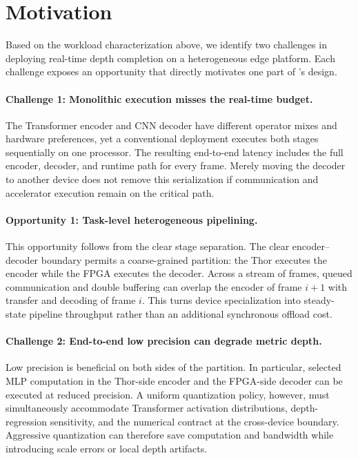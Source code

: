 \section{Motivation}
\label{sec:motivation}

Based on the workload characterization above, we identify two challenges in
deploying real-time depth completion on a heterogeneous edge platform.  Each
challenge exposes an opportunity that directly motivates one part of
\system's design.

\paragraph{Challenge 1: Monolithic execution misses the real-time budget.}

The Transformer encoder and CNN decoder have different operator mixes and
hardware preferences, yet a conventional deployment executes both stages
sequentially on one processor.  The resulting end-to-end latency includes the
full encoder, decoder, and runtime path for every frame.  Merely moving the
decoder to another device does not remove this serialization if communication
and accelerator execution remain on the critical path.

\paragraph{Opportunity 1: Task-level heterogeneous pipelining.}
This opportunity follows from the clear stage separation.
The clear encoder--decoder boundary permits a coarse-grained partition: the
Thor executes the encoder while the FPGA executes the decoder.  Across a
stream of frames, queued communication and double buffering can overlap the
encoder of frame $i+1$ with transfer and decoding of frame $i$.  This turns
device specialization into steady-state pipeline throughput rather than an
additional synchronous offload cost.

\paragraph{Challenge 2: End-to-end low precision can degrade metric depth.}

Low precision is beneficial on both sides of the partition.  In particular,
selected MLP computation in the Thor-side encoder and the FPGA-side decoder
can be executed at reduced precision.  A uniform quantization policy, however,
must simultaneously accommodate Transformer activation distributions,
depth-regression sensitivity, and the numerical contract at the cross-device
boundary.  Aggressive quantization can therefore save computation and
bandwidth while introducing scale errors or local depth artifacts.

